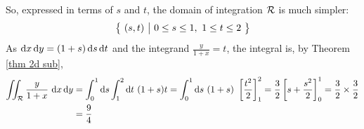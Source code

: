 \begin{eg}
\begin{efig}
\begin{center}
      \end{center}
      \end{efig}
So, expressed in terms of $s$ and $t$, the domain of integration $\mathcal{R}$ is
much simpler:
\begin{equation*}
\big\{ \ (s,t)\ \big|\ 0\le s\le 1,\ 1\le t\le 2\ \big\}
\end{equation*}
As $\mathrm{d}x\,\mathrm{d}y = (1+s)\,\mathrm{d}s\,\mathrm{d}t$ and the integrand  
$\frac{y}{1+x}=t$, the integral is, by Theorem \ref{thm 2d sub},
\begin{align*}
\iint_{\mathcal{R}}\frac{y}{1+x}\ \mathrm{d}x\,\mathrm{d}y
&=\int_0^1\mathrm{d}s\int_1^2\mathrm{d}t\ (1+s)t
=\int_0^1\mathrm{d}s\ (1+s)\ \left[\frac{t^2}{2}\right]_1^2
=\frac{3}{2}\left[s+\frac{s^2}{2}\right]_0^1
=\frac{3}{2}\times \frac{3}{2} \\
&=\frac{9}{4}
\end{align*}





\end{eg}


